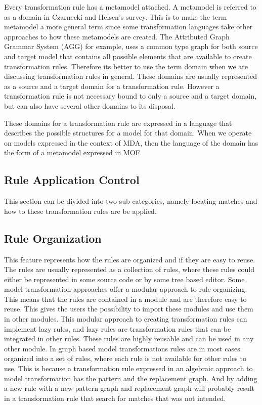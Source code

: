 Every transformation rule has a metamodel attached. A metamodel is referred
to as a domain in Czarnecki and Helsen's survey\cite{Czarnecki2006}. This
is to make the term metamodel a more general term since some transformation
languages take other approaches to how these metamodels are created. The
Attributed Graph Grammar System\cite{AGG} (AGG) for example, uses a common type
graph for both source and target model that contains all possible elements that
are available to create transformation rules. Therefore its better to use the
term domain when we are discussing transformation rules in general. These
domains are usually represented as a source and a target domain for a
transformation rule. However a transformation rule is not necessary bound to
only a source and a target domain, but can also have several other domains to
its disposal. 

These domains for a transformation rule are expressed in a language that
describes the possible structures for a model for that domain. When we operate
on models expressed in the context of MDA, then the language of the domain has
the form of a metamodel expressed in MOF\cite{MOF}.


\subsection{Rule Application Control}

This section can be divided into two sub categories, namely locating matches and
how to these transformation rules are be applied. 

\subsection{Rule Organization}

This feature represents how the rules are organized and if they are easy to
reuse. The rules are usually represented as a collection of rules, where these
rules could either be represented in some source code or by some tree based
editor. Some model transformation approaches offer a modular approach to rule
organizing. This means that the rules are contained in a module and are
therefore easy to reuse. This gives the users the possibility to import these
modules and use them in other modules. This modular approach to creating
transformation rules can implement lazy rules, and lazy rules are transformation
rules that can be integrated in other rules. These rules are highly reusable and
can be used in any other module. In graph based model transformations rules are
in most cases organized into a set of rules, where each rule is not available
for other rules to use. This is because a transformation rule expressed in an
algebraic approach to model transformation has the pattern and the replacement
graph. And by adding a new rule with a new pattern graph and replacement graph
will probably result in a transformation rule that search for matches that was
not intended. 

